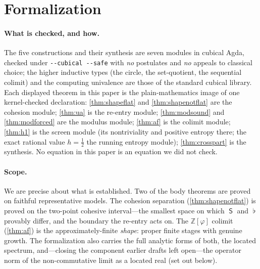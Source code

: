 \documentclass[11pt,letterpaper]{article}
\theoremstyle{plain}
\theoremstyle{definition}
\theoremstyle{remark}
\newcommand{\shapeM}{\mathop{\mathsf{S}}\nolimits}      %
\newcommand{\flatM}{\mathop{\flat}\nolimits}            %
\newcommand{\ZZ}{\mathbb{Z}}
\newcommand{\Zphi}{\ZZ[\varphi]}
\newcommand{\Llog}{h}                                   %
\begin{document}
\section{Formalization}\label{sec:formalization}

\paragraph{What is checked, and how.}
The five constructions and their synthesis are seven modules in cubical Agda,
checked under \texttt{-{}-cubical -{}-safe} with \emph{no} postulates and \emph{no}
appeals to classical choice; the higher inductive types (the circle, the
set-quotient, the sequential colimit) and the computing univalence are those of
the standard cubical library. Each displayed theorem in this paper is the
plain-mathematics image of one kernel-checked declaration: \cref{thm:shapeflat}
and \cref{thm:shapenotflat} are the cohesion module; \cref{thm:ua} is the re-entry
module; \cref{thm:modsound} and \cref{thm:modforced} are the modulus module;
\cref{thm:af} is the colimit module; \cref{thm:h1} is the screen module (its
nontriviality and positive entropy there; the exact rational value $\Llog=\tfrac12$
the running entropy module); \cref{thm:crosspart} is the synthesis. No equation in this paper is an equation we
did not check.

\paragraph{Scope.}
We are precise about what is established. Two of the body theorems are proved on
faithful representative models. The cohesion separation (\cref{thm:shapenotflat}) is
proved on the two-point cohesive interval---the smallest space on which $\shapeM$ and
$\flatM$ provably differ, and the boundary the re-entry acts on. The $\Zphi$ colimit
(\cref{thm:af}) is the approximately-finite \emph{shape}: proper finite stages with
genuine growth. The formalization also carries the full analytic forms of both, the
located spectrum, and---closing the component earlier drafts left open---the operator
norm of the non-commutative limit as a located real (set out below).
\end{document}
